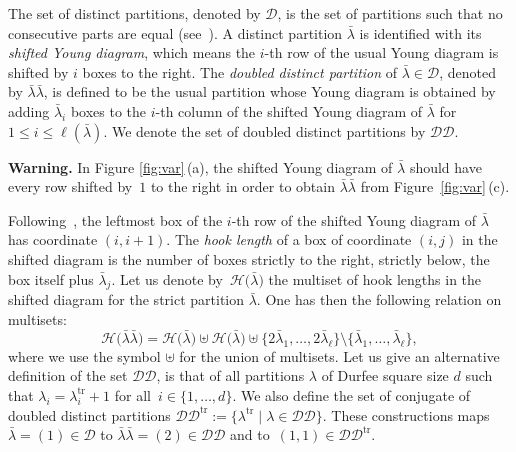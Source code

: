 \documentclass[pdftex]{sigma}
\numberwithin{equation}{section}
\def\cch{\mathcal H}
\def\ccdd{\mathcal {DD}}
\def\ccd{\mathcal {D}}
\begin{document}
 The set of distinct partitions, denoted by $\ccd$, is the set of partitions such that no consecutive parts are equal (see~\cite{HX,Macbook,Sta99}). A distinct partition $\bar{\lambda}$ is identified with its \textit{shifted Young diagram}, which means the $i$-th row of the usual Young diagram is shifted by $i$ boxes to the right. The \textit{doubled distinct partition} of $\bar{\lambda}\in\ccd$, denoted by $\bar{\lambda}\bar{\lambda}$, is defined to be the usual partition whose Young diagram is obtained by adding $\bar{\lambda}_i$ boxes to the $i$-th column of the shifted Young diagram of $\bar{\lambda}$ for $1\leq i\leq \ell (\bar{\lambda})$.
 We denote the set of doubled distinct partitions by $\ccdd$.


  \textbf{Warning.} In Figure \ref{fig:var}\,(a), the shifted Young diagram of $\bar{\lambda}$ should have every row shifted by~$1$ to the right in order to obtain $\bar{\lambda}\bar{\lambda}$ from Figure~\ref{fig:var}\,(c).



 Following~\cite{HX}, the leftmost box of the $i$-th row of the shifted Young diagram of $\bar{\lambda}$ has coordinate $(i,i+1)$. The \textit{hook length} of a box of coordinate $(i,j)$ in the shifted diagram is the number of boxes strictly to the right, strictly below, the box itself plus $\bar{\lambda}_j$. Let us denote by~$\cch\bigl(\bar{\lambda}\bigr)$ the multiset of hook lengths in the shifted diagram for the strict partition $\bar{\lambda}$. One has then the following relation on multisets:
 \begin{equation}\label{eq:hookdd}
  \cch\bigl(\bar{\lambda}\bar{\lambda}\bigr)=\cch\bigl(\bar{\lambda}\bigr)\uplus\cch\bigl(\bar{\lambda}\bigr)\uplus\bigl\lbrace 2\bar{\lambda}_1,\dots, 2\bar{\lambda}_\ell\bigr\rbrace\setminus\bigl\lbrace \bar{\lambda}_1,\dots ,\bar{\lambda}_\ell\bigr\rbrace,
 \end{equation}
 where we use the symbol $\uplus$ for the union of multisets. Let us give an alternative definition of the set $\ccdd$, is that of all partitions $\lambda$ of Durfee square size $d$ such that ${\lambda_i=\lambda_i^{\mathrm{tr}}+1}$ for all~${i\in\lbrace 1,\dots,d\rbrace}$. We also define the set of conjugate of doubled distinct partitions $\ccdd^{\mathrm{tr}}:=\bigl\lbrace \lambda^{\mathrm{tr}}\mid \lambda\in\ccdd\bigr\rbrace$.
 These constructions maps $\bar{\lambda}=(1)\in\ccd$ to $\bar{\lambda}\bar{\lambda}=(2)\in \ccdd$ and to~${(1,1)\in\ccdd^{\mathrm{tr}}}$.
\end{document}
